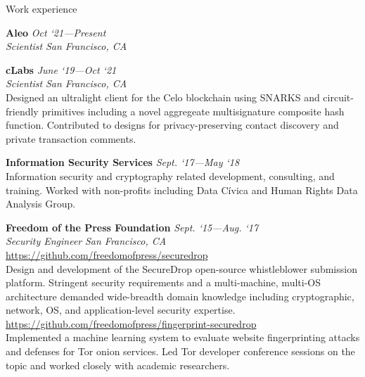 \documentclass{cv}
\begin{document}
\pagebreak
\begin{rSection}{Work experience}

\textbf{Aleo} \hfill \emph{Oct `21---Present} \\
\emph{Scientist} \hfill \emph{San Francisco, CA}

\textbf{cLabs} \hfill \emph{June `19---Oct `21} \\
\emph{Scientist} \hfill \emph{San Francisco, CA} \\
{\small Designed an ultralight client for the Celo blockchain using SNARKS and circuit-friendly primitives including a novel aggregeate multisignature composite hash function. Contributed to designs for privacy-preserving contact discovery and private transaction comments.}


\textbf{Information Security Services} \hfill \emph{Sept. `17---May `18} \\
{\small Information security and cryptography related development, consulting, and training. Worked with non-profits including Data Cívica and Human Rights Data Analysis Group.}

\textbf{Freedom of the Press Foundation} \hfill \emph{Sept. `15---Aug. `17} \\
\emph{Security Engineer} \hfill \emph{San Francisco, CA} \\
\url{https://github.com/freedomofpress/securedrop} \\
{\small Design and development of the SecureDrop open-source whistleblower submission platform. Stringent security requirements and a multi-machine, multi-OS architecture demanded wide-breadth domain knowledge including cryptographic, network, OS, and application-level security expertise.} \\
\url{https://github.com/freedomofpress/fingerprint-securedrop} \\
{\small Implemented a machine learning system to evaluate website fingerprinting attacks and defenses for Tor onion services. Led Tor developer conference sessions on the topic and worked closely with academic researchers.}

\end{rSection}
\end{document}
